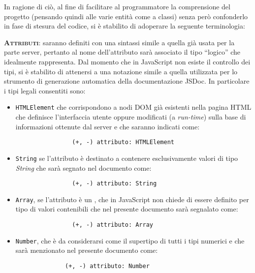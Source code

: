 In ragione di ciò, al fine di facilitare al programmatore la comprensione del progetto (pensando quindi alle varie entità come a classi) senza però confonderlo in fase di stesura del codice, si è stabilito di adoperare la seguente terminologia:

\begin{description}
	\item{\scshape\bfseries Attributi}: saranno definiti con una sintassi simile a quella già usata per la parte server, pertanto al nome dell'attributo sarà associato il tipo ``logico'' che idealmente rappresenta. Dal momento che in JavaScript non esiste il controllo dei tipi, si è stabilito di attenersi a una notazione simile a quella utilizzata per lo strumento di generazione automatica della documentazione JSDoc. In particolare i tipi legali consentiti sono:
	\begin{itemize}
	  \item \texttt{HTMLElement} che corrispondono a nodi DOM già esistenti nella pagina HTML che definisce l'interfaccia utente oppure modificati (a \textit{run-time}) sulla base di informazioni ottenute dal server e che saranno indicati come:
	  	\begin{verbatim}
				(+, -) attributo: HTMLElement
			\end{verbatim}
	
    \item \texttt{String} se l'attributo è destinato a contenere esclusivamente valori di tipo \textit{String} che sarà segnato nel documento come:
			
			\begin{verbatim}
				(+, -) attributo: String
			\end{verbatim}
			
			\item \texttt{Array}, se l'attributo è un , che in JavaScript non chiede di essere definito per tipo di valori contenibili che nel presente documento sarà segnalato come:
			
			\begin{verbatim}
				(+, -) attributo: Array
			\end{verbatim}
			
			\item \texttt{Number}, che è da considerarsi come il supertipo di tutti i tipi numerici e che sarà menzionato nel presente documento come:
			\begin{verbatim}
			  (+, -) attributo: Number
			\end{verbatim}
			

\end{itemize}
\end{description}

